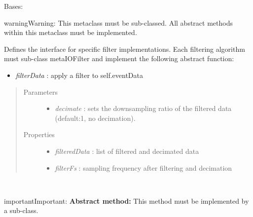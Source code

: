 \documentclass[letterpaper,10pt,english]{sphinxmanual}
\begin{document}
\begin{fulllineitems}
\label{api-doc/mosaic.meta:mosaic.metaIOFilter.metaIOFilter}
Bases: \href{http://docs.python.org/library/functions.html\#object}{}

\begin{notice}{warning}{Warning:}
This metaclass must be sub-classed. All abstract methods within this metaclass must be implemented.
\end{notice}

Defines the interface for specific filter implementations. Each filtering
algorithm must sub-class metaIOFilter and implement the following abstract
function:
\begin{itemize}
\item {} 
\emph{filterData} :        apply a filter to self.eventData

\end{itemize}
\begin{quote}\begin{description}
\item[{Parameters}] \leavevmode\begin{itemize}
\item {} 
\emph{decimate} :          sets the downsampling ratio of the filtered data (default:1, no decimation).

\end{itemize}

\item[{Properties}] \leavevmode\begin{itemize}
\item {} 
\emph{filteredData} :              list of filtered and decimated data

\item {} 
\emph{filterFs} :                  sampling frequency after filtering and decimation

\end{itemize}

\end{description}\end{quote}

\begin{fulllineitems}
\label{api-doc/mosaic.meta:mosaic.metaIOFilter.metaIOFilter._init}~
\begin{notice}{important}{Important:}
\textbf{Abstract method:} This method must be implemented by a sub-class.
\end{notice}


\end{fulllineitems}
\end{fulllineitems}
\end{document}

